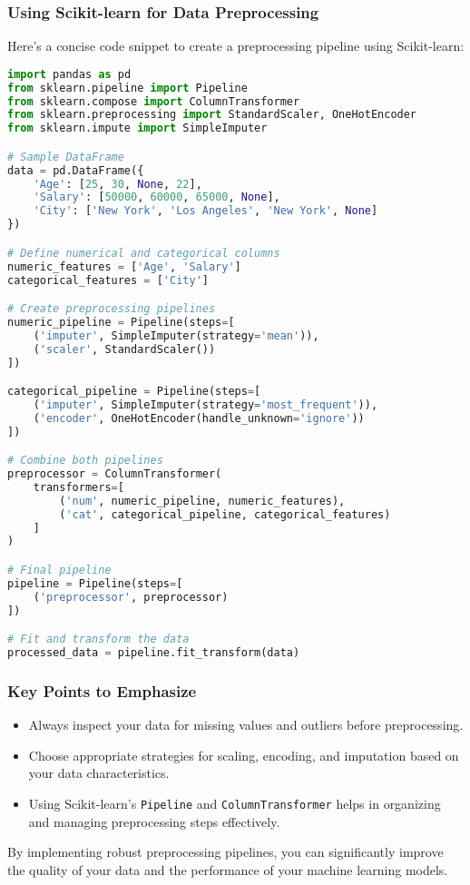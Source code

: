 \documentclass[aspectratio=169]{beamer}
\begin{document}
\begin{frame}[fragile]
    \frametitle{Using Scikit-learn for Data Preprocessing}
    Here’s a concise code snippet to create a preprocessing pipeline using Scikit-learn:

    \begin{lstlisting}[language=Python]
import pandas as pd
from sklearn.pipeline import Pipeline
from sklearn.compose import ColumnTransformer
from sklearn.preprocessing import StandardScaler, OneHotEncoder
from sklearn.impute import SimpleImputer

# Sample DataFrame
data = pd.DataFrame({
    'Age': [25, 30, None, 22],
    'Salary': [50000, 60000, 65000, None],
    'City': ['New York', 'Los Angeles', 'New York', None]
})

# Define numerical and categorical columns
numeric_features = ['Age', 'Salary']
categorical_features = ['City']

# Create preprocessing pipelines
numeric_pipeline = Pipeline(steps=[
    ('imputer', SimpleImputer(strategy='mean')),
    ('scaler', StandardScaler())
])

categorical_pipeline = Pipeline(steps=[
    ('imputer', SimpleImputer(strategy='most_frequent')),
    ('encoder', OneHotEncoder(handle_unknown='ignore'))
])

# Combine both pipelines
preprocessor = ColumnTransformer(
    transformers=[
        ('num', numeric_pipeline, numeric_features),
        ('cat', categorical_pipeline, categorical_features)
    ]
)

# Final pipeline
pipeline = Pipeline(steps=[
    ('preprocessor', preprocessor)
])

# Fit and transform the data
processed_data = pipeline.fit_transform(data)
    \end{lstlisting}
\end{frame}

\begin{frame}
    \frametitle{Key Points to Emphasize}
    \begin{itemize}
        \item Always inspect your data for missing values and outliers before preprocessing.
        \item Choose appropriate strategies for scaling, encoding, and imputation based on your data characteristics.
        \item Using Scikit-learn's \texttt{Pipeline} and \texttt{ColumnTransformer} helps in organizing and managing preprocessing steps effectively.
    \end{itemize}

    By implementing robust preprocessing pipelines, you can significantly improve the quality of your data and the performance of your machine learning models.
\end{frame}
\end{document}
